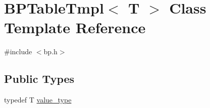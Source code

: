 \hypertarget{class_b_p_table_tmpl}{\section{B\+P\+Table\+Tmpl$<$ T $>$ Class Template Reference}
\label{class_b_p_table_tmpl}
}


{\ttfamily \#include $<$bp.\+h$>$}

\subsection*{Public Types}
\begin{DoxyCompactItemize}
\item 
typedef T \hyperlink{class_b_p_table_tmpl_abeaa8313585c7a571fae9d26211432a6}{value\+\_\+type}
\end{DoxyCompactItemize}
